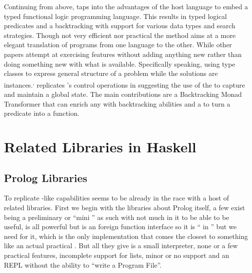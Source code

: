 \documentclass[thesis-solanki.tex]{subfiles}
\begin{document}
Continuing from above, \cite{claessen2000typed} taps into the advantages of the host language to embed a typed
functional logic programming language.
This results in typed logical predicates and a backtracking  with support for various data types and search
strategies.
Though not very efficient nor practical the method aims at a more elegant translation of programs from one language
to the other.
While other papers \cite{erwig2004escape} attempt at exercising  features without adding
anything new rather than doing something new with what is available.
Specifically speaking, using  type classes to express general structure of a problem while the
solutions are instances.\textsuperscript{,}
\cite{hinze1998prological} replicates 's control operations in  suggesting the
use of the   to capture and maintain a global state.
The main contributions are a Backtracking Monad Transformer that can enrich any  with backtracking abilities
and a  to turn a  predicate into a  function.



\section{Related Libraries in Haskell}
\subsection{Prolog Libraries}

To replicate -like
capabilities  seems to be already in the race
with a host of related libraries.
First we begin with the libraries about Prolog itself, a few exist \cite{nanoprolog-lib} being a preliminary or
``mini '' as such with not much in it to be able to be useful, \cite{hswip-lib} is all powerful but is an
foreign function interface so it is `` in '' but we need  for it,
\cite{prolog-lib} which is the only implementation that comes the closest to something like an actual practical
.
But all they give is a small interpreter, none or a few practical features, incomplete support for lists, minor or
no  support and an REPL without the ability to ``write a  Program File''.
\end{document}
